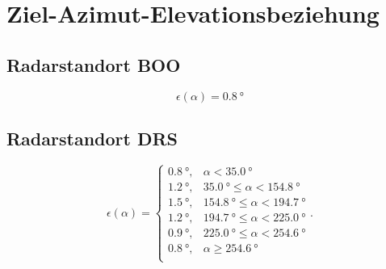 \documentclass[parskip=half]{scrartcl}
\begin{document}
\section{Ziel-Azimut-Elevationsbeziehung}

\subsection{Radarstandort BOO}
\[ \epsilon(\alpha) = \SI{0.8}{\degree} \]

\subsection{Radarstandort DRS}

\[
     \epsilon(\alpha)=\left\{\begin{array}{ll} \SI{0.8}{\degree}, & \alpha < \SI{35.0}{\degree} \\
         			                           \SI{1.2}{\degree}, & \SI{35.0}{\degree} \leq \alpha < \SI{154.8}{\degree} \\
         			                           \SI{1.5}{\degree}, & \SI{154.8}{\degree} \leq \alpha < \SI{194.7}{\degree} \\
         			                           \SI{1.2}{\degree}, & \SI{194.7}{\degree} \leq \alpha < \SI{225.0}{\degree} \\
         			                           \SI{0.9}{\degree}, & \SI{225.0}{\degree} \leq \alpha < \SI{254.6}{\degree} \\
         			                           \SI{0.8}{\degree}, & \alpha \geq \SI{254.6}{\degree} \\
         			          \end{array}
         			  \right. .
  \]
\end{document}
